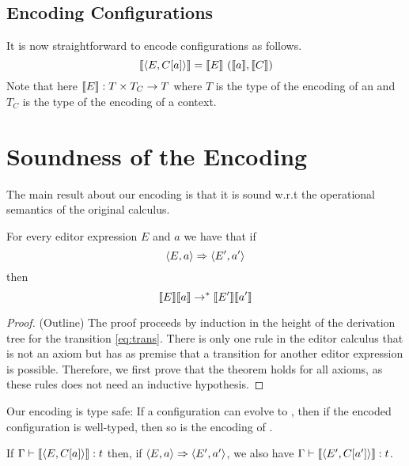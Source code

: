 \documentclass[sigplan,screen]{acmart}
\begin{document}
\subsection{Encoding Configurations}

It is now straightforward to encode configurations as follows.
%
\[ \llbracket \langle E, C[a] \rangle \rrbracket = \llbracket E \rrbracket \  (\llbracket a \rrbracket, \llbracket C \rrbracket) \]
%
Note that here $\llbracket E \rrbracket : T \times T_C \to T$ where $T$ is the type
of the encoding of an \abt and $T_C$ is the type of the encoding of a context.

\section{Soundness of the Encoding} \label{sec:sound}

The main result about our encoding is that it is sound w.r.t the
operational semantics of the original calculus.

\begin{theorem}[Soundness] \label{thm:sound} For every editor
  expression $E$ and \abt $a$ we have that if
  \begin{equation} \langle E,a \rangle \stackrel{}{\Rightarrow} \langle E',a' \rangle \label{eq:trans} \end{equation}
  then
  \begin{equation} \llbracket E \rrbracket\llbracket a \rrbracket \rightarrow^{\ast}
    \llbracket E' \rrbracket\llbracket a' \rrbracket  \label{eq:ctrans} \end{equation}
\end{theorem}
\begin{proof}(Outline) The proof proceeds by induction in the height
  of the derivation tree for the transition \eqref{eq:trans}. There is
  only one rule in the editor calculus that is not an axiom but has as
  premise that a transition for another editor expression is
  possible. Therefore, we first prove that the theorem holds for all
  axioms, as these rules does not need an inductive hypothesis.
\end{proof}

Our encoding is type safe: If a configuration
 can evolve to , then if the encoded configuration
is well-typed, then so is the encoding of .

\begin{corollary}
  If $\Gamma \vdash \llbracket \langle E,C[a] \rangle \rrbracket : t$ then, if $\langle E,a \rangle
  \stackrel{}{\Rightarrow} \langle E',a' \rangle$, we also have $\Gamma \vdash \llbracket \langle E',C[a'] \rangle \rrbracket : t$.
\end{corollary}
\end{document}
